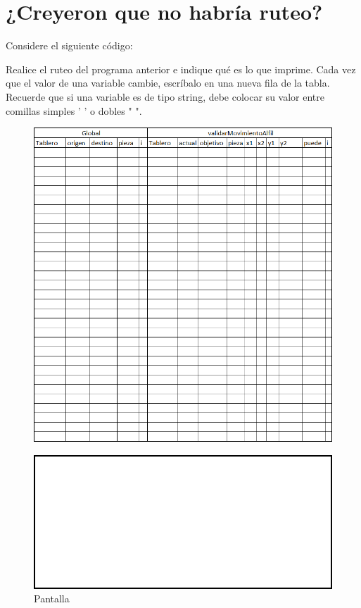 \section{¿Creyeron que no habría ruteo?}

Considere el siguiente código:




\newpage

Realice el ruteo del programa anterior e indique qué es lo que imprime. Cada vez que el valor de una variable cambie, escríbalo en una nueva fila de la tabla. Recuerde que si una variable es de tipo string, debe colocar su valor entre comillas simples ’ ’ o dobles " ".

\begin{figure}[H]
    \centering
    \includegraphics[width = 0.8 \textwidth]{Imagenes/tablaRuteo.png}
\end{figure}

\begin{figure}[H]
    \centering
    \includegraphics[width = 0.4 \textwidth]{Imagenes/consola.png}
    \caption{Pantalla}
\end{figure}
